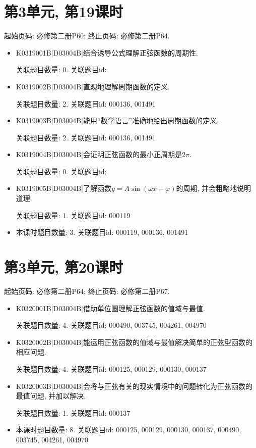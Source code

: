 \section*{第3单元, 第19课时}
起始页码: 必修第二册P60; 终止页码: 必修第二册P64.
\begin{itemize}
\item K0319001B|D03004B|结合诱导公式理解正弦函数的周期性.

关联题目数量: 0. 关联题目id: 

\item K0319002B|D03004B|直观地理解周期函数的定义.

关联题目数量: 2. 关联题目id: 000136, 001491

\item K0319003B|D03004B|能用``数学语言''准确地给出周期函数的定义.

关联题目数量: 2. 关联题目id: 000136, 001491

\item K0319004B|D03004B|会证明正弦函数的最小正周期是$2\pi$.

关联题目数量: 0. 关联题目id: 

\item K0319005B|D03004B|了解函数$y=A\sin(\omega x+\varphi)$的周期, 并会粗略地说明道理.

关联题目数量: 1. 关联题目id: 000119

\item 本课时题目数量: 3. 关联题目id: 000119, 000136, 001491

\end{itemize}

\section*{第3单元, 第20课时}
起始页码: 必修第二册P64; 终止页码: 必修第二册P67.
\begin{itemize}
\item K0320001B|D03004B|借助单位圆理解正弦函数的值域与最值.

关联题目数量: 4. 关联题目id: 000490, 003745, 004261, 004970

\item K0320002B|D03004B|能运用正弦函数的值域与最值解决简单的正弦型函数的相应问题.

关联题目数量: 4. 关联题目id: 000125, 000129, 000130, 000137

\item K0320003B|D03004B|会将与正弦有关的现实情境中的问题转化为正弦函数的最值问题, 并加以解决.

关联题目数量: 1. 关联题目id: 000137

\item 本课时题目数量: 8. 关联题目id: 000125, 000129, 000130, 000137, 000490, 003745, 004261, 004970

\end{itemize}

